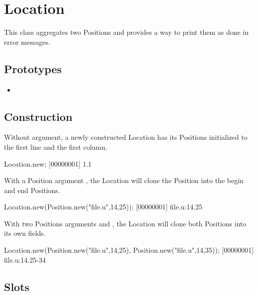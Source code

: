 \section{Location}

This class aggregates two Positions and provides a way to print them as done
in error messages.

\subsection{Prototypes}
\begin{itemize}
\item {}
\end{itemize}

\subsection{Construction}

Without argument, a newly constructed Location has its Positions initialized
to the first line and the first column.

\begin{urbiscript}
Location.new;
[00000001] 1.1
\end{urbiscript}

With a Position argument , the Location will clone the Position into
the begin and end Positions.

\begin{urbiscript}
Location.new(Position.new("file.u",14,25));
[00000001] file.u:14.25
\end{urbiscript}

With two Positions arguments  and , the Location will
clone both Positions into its own fields.

\begin{urbiscript}
Location.new(Position.new("file.u",14,25), Position.new("file.u",14,35));
[00000001] file.u:14.25-34
\end{urbiscript}

\subsection{Slots}

